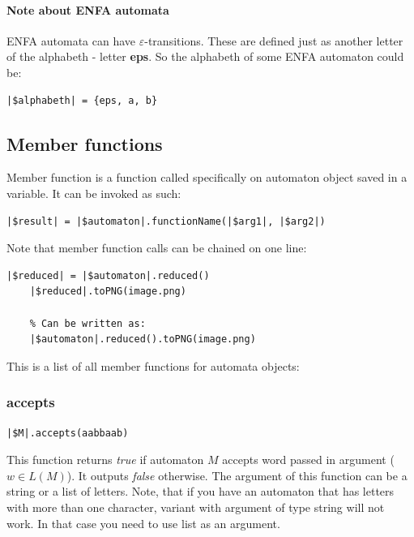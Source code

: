 \documentclass{ctuthesis}
\begin{document}
\paragraph{Note about ENFA automata}
ENFA automata can have $\varepsilon$-transitions. These are defined just as another letter of the alphabeth - letter \textbf{eps}. So the alphabeth of some ENFA automaton could be:
\begin{lstlisting}[language = JASL]
	|$alphabeth| = {eps, a, b}
\end{lstlisting} 

\subsection{Member functions}
Member function is a function called specifically on automaton object saved in a variable. It can be invoked as such:

\begin{minipage}{\linewidth}
\begin{lstlisting}[language = JASL_snippet]
	|$result| = |$automaton|.functionName(|$arg1|, |$arg2|)	
\end{lstlisting}
\end{minipage} 

Note that member function calls can be chained on one line:

\begin{minipage}{\linewidth}
\begin{lstlisting}[language = JASL]
	|$reduced| = |$automaton|.reduced()
	|$reduced|.toPNG(image.png)
	
	% Can be written as:
	|$automaton|.reduced().toPNG(image.png)
\end{lstlisting}
\end{minipage}

This is a list of all member functions for automata objects:

\subsubsection{accepts}
\begin{lstlisting}[language = JASL_snippet]
	|$M|.accepts(aabbaab)
\end{lstlisting}

This function returns \textit{true} if automaton $M$ accepts word passed in argument ($w \in L(M)$). It outputs \textit{false} otherwise. The argument of this function can be a string or a list of letters. Note, that if you have an automaton that has letters with more than one character, variant with argument of type string will not work. In that case you need to use list as an argument.
\end{document}

